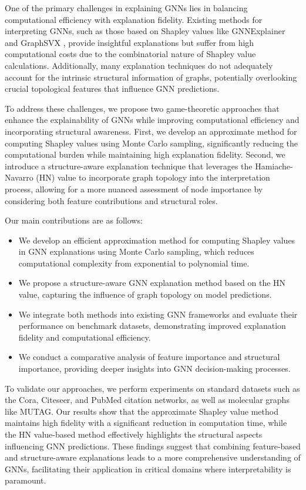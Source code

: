 \documentclass{article}
\begin{document}
One of the primary challenges in explaining GNNs lies in balancing computational efficiency with explanation fidelity. Existing methods for interpreting GNNs, such as those based on Shapley values like GNNExplainer and GraphSVX \cite{arXiv:2104.10482v2}, provide insightful explanations but suffer from high computational costs due to the combinatorial nature of Shapley value calculations. Additionally, many explanation techniques do not adequately account for the intrinsic structural information of graphs, potentially overlooking crucial topological features that influence GNN predictions.

To address these challenges, we propose two game-theoretic approaches that enhance the explainability of GNNs while improving computational efficiency and incorporating structural awareness. First, we develop an approximate method for computing Shapley values using Monte Carlo sampling, significantly reducing the computational burden while maintaining high explanation fidelity. Second, we introduce a structure-aware explanation technique that leverages the Hamiache-Navarro (HN) value \cite{arXiv:2201.12380v5} to incorporate graph topology into the interpretation process, allowing for a more nuanced assessment of node importance by considering both feature contributions and structural roles.

Our main contributions are as follows:
\begin{itemize}
    \item We develop an efficient approximation method for computing Shapley values in GNN explanations using Monte Carlo sampling, which reduces computational complexity from exponential to polynomial time.
    \item We propose a structure-aware GNN explanation method based on the HN value, capturing the influence of graph topology on model predictions.
    \item We integrate both methods into existing GNN frameworks and evaluate their performance on benchmark datasets, demonstrating improved explanation fidelity and computational efficiency.
    \item We conduct a comparative analysis of feature importance and structural importance, providing deeper insights into GNN decision-making processes.
\end{itemize}

To validate our approaches, we perform experiments on standard datasets such as the Cora, Citeseer, and PubMed citation networks, as well as molecular graphs like MUTAG. Our results show that the approximate Shapley value method maintains high fidelity with a significant reduction in computation time, while the HN value-based method effectively highlights the structural aspects influencing GNN predictions. These findings suggest that combining feature-based and structure-aware explanations leads to a more comprehensive understanding of GNNs, facilitating their application in critical domains where interpretability is paramount.
\end{document}
